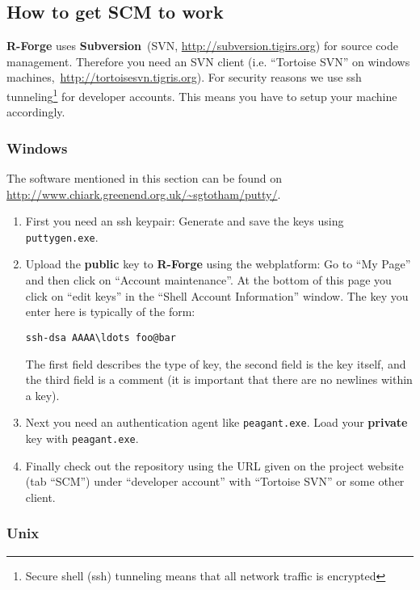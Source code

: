 \documentclass[a4paper]{article}
\begin{document}
\subsection{How to get SCM to work}
\label{sec:scmhowto}

\textbf{R-Forge} uses
\textbf{Subversion}~(SVN, \url{http://subversion.tigirs.org}) for
source code management.
Therefore you need an SVN client (i.e. ``Tortoise SVN'' on
windows machines,~\url{http://tortoisesvn.tigris.org}). For security
reasons we use ssh tunneling\footnote{Secure shell (ssh) tunneling
  means that all network traffic is encrypted} for
developer accounts. This means you have to setup your machine
accordingly.

\subsubsection{Windows}

The software mentioned in this section can be found
on\newline
\url{http://www.chiark.greenend.org.uk/~sgtotham/putty/}.
\begin{enumerate}
\item First you need an ssh keypair: Generate and save the keys
  using \texttt{puttygen.exe}.   
\item Upload the \textbf{public} key to \textbf{R-Forge} using the webplatform: Go to
  ``My Page'' and then click on ``Account maintenance''. At the bottom
  of this page you click on ``edit keys'' in the ``Shell Account
  Information'' window. The key you enter here is typically of the
  form:
\begin{verbatim}
ssh-dsa AAAA\ldots foo@bar
\end{verbatim}
  The first field
  describes the type of key, the second field is the key itself, and
  the third field is a comment (it is important that there are no
  newlines within a key).
\item Next you need an authentication agent like \texttt{peagant.exe}. Load
  your \textbf{private} key with \texttt{peagant.exe}.
\item Finally check out the repository using the URL given on the
  project website (tab ``SCM'') under ``developer account'' with
  ``Tortoise SVN'' or some other client.
\end{enumerate}

\subsubsection{Unix}
\end{document}
